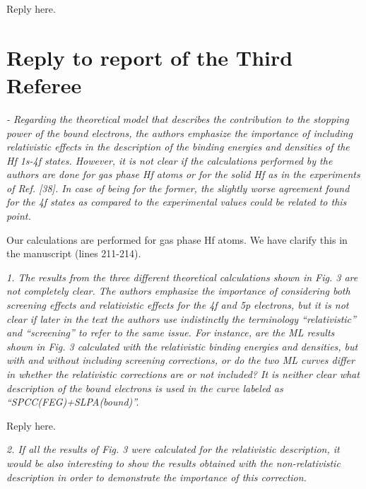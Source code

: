 \documentclass[a4paper,10pt]{article}
\begin{document}
\vspace{0.1cm}
{\color{red}Reply here.}




\newpage
\section{Reply to report of the Third Referee}

\textsl{
- Regarding the theoretical model that describes the contribution to
the stopping power of the bound electrons, the authors emphasize the
importance of including relativistic effects in the description of the
binding energies and densities of the Hf 1s-4f states. However, it is
not clear if the calculations performed by the authors are done for
gas phase Hf atoms or for the solid Hf as in the experiments of Ref.
[38]. In case of being for the former, the slightly worse agreement
found for the 4f states as compared to the experimental values could
be related to this point.}

\vspace{0.1cm}
Our calculations are performed for gas phase Hf atoms. We have clarify
this in the manuscript (lines 211-214).

\vspace{0.25cm}
\textsl{
1. The results from the three different theoretical calculations shown
in Fig. 3 are not completely clear. The authors emphasize the
importance of considering both screening effects and relativistic
effects for the 4f and 5p electrons, but it is not clear if later in
the text the authors use indistinctly the terminology ``relativistic''
and ``screening'' to refer to the same issue. For instance, are the ML
results shown in Fig. 3 calculated with the relativistic binding
energies and densities, but with and without including screening
corrections, or do the two ML curves differ in whether the
relativistic corrections are or not included? It is neither clear what
description of the bound electrons is used in the curve labeled as
``SPCC(FEG)+SLPA(bound)''.}

\vspace{0.1cm}
{\color{red}Reply here.}

\vspace{0.25cm}
\textsl{
2. If all the results of Fig. 3 were calculated for the relativistic
description, it would be also interesting to show the results obtained
with the non-relativistic description in order to demonstrate the
importance of this correction.}
\end{document}
